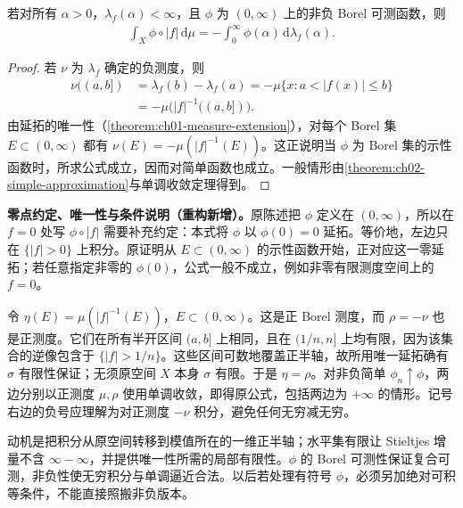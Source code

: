 \documentclass[../../main.tex]{subfiles}
\begin{document}
\begin{proposition}\label{proposition:ch06-distribution-pushforward}
若对所有 $\alpha>0$，$\lambda_f(\alpha)<\infty$，且 $\phi$ 为 $(0,\infty)$ 上的非负 Borel 可测函数，则
\begin{align*}
\int_X\phi\circ|f|\,\mathrm d\mu=-\int_0^\infty\phi(\alpha)\,\mathrm d\lambda_f(\alpha).
\end{align*}
\end{proposition}
\begin{proof}
若 $\nu$ 为 $\lambda_f$ 确定的负测度，则
\begin{align*}
\nu((a,b])&=\lambda_f(b)-\lambda_f(a)
=-\mu\{x:a<|f(x)|\leqslant b\}\\
&=-\mu\bigl(|f|^{-1}((a,b])\bigr).
\end{align*}
由延拓的唯一性（\cref{theorem:ch01-measure-extension}），对每个 Borel 集 $E\subset(0,\infty)$ 都有 $\nu(E)=-\mu(|f|^{-1}(E))$。这正说明当 $\phi$ 为 Borel 集的示性函数时，所求公式成立，因而对简单函数也成立。一般情形由\cref{theorem:ch02-simple-approximation}与单调收敛定理得到。
\end{proof}
\begin{remark}
\textbf{零点约定、唯一性与条件说明（重构新增）。}原陈述把 $\phi$ 定义在 $(0,\infty)$，所以在 $f=0$ 处写 $\phi\circ|f|$ 需要补充约定：本式将 $\phi$ 以 $\phi(0)=0$ 延拓。等价地，左边只在 $\{|f|>0\}$ 上积分。原证明从 $E\subset(0,\infty)$ 的示性函数开始，正对应这一零延拓；若任意指定非零的 $\phi(0)$，公式一般不成立，例如非零有限测度空间上的 $f=0$。

令 $\eta(E)=\mu(|f|^{-1}(E))$，$E\subset(0,\infty)$。这是正 Borel 测度，而 $\rho=-\nu$ 也是正测度。它们在所有半开区间 $(a,b]$ 上相同，且在 $(1/n,n]$ 上均有限，因为该集合的逆像包含于 $\{|f|>1/n\}$。这些区间可数地覆盖正半轴，故所用唯一延拓确有 $\sigma$ 有限性保证；无须原空间 $X$ 本身 $\sigma$ 有限。于是 $\eta=\rho$。对非负简单 $\phi_n\uparrow\phi$，两边分别以正测度 $\mu,\rho$ 使用单调收敛，即得原公式，包括两边为 $+\infty$ 的情形。记号右边的负号应理解为对正测度 $-\nu$ 积分，避免任何无穷减无穷。

动机是把积分从原空间转移到模值所在的一维正半轴；水平集有限让 Stieltjes 增量不含 $\infty-\infty$，并提供唯一性所需的局部有限性。$\phi$ 的 Borel 可测性保证复合可测，非负性使无穷积分与单调逼近合法。以后若处理有符号 $\phi$，必须另加绝对可积等条件，不能直接照搬非负版本。
\end{remark}
\end{document}
